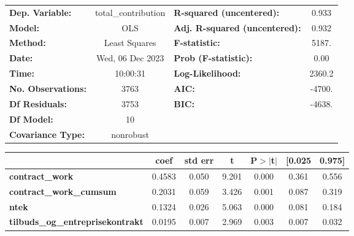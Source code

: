 \begin{center}
\begin{tabular}{lclc}
\toprule
\textbf{Dep. Variable:}                  & total\_contribution & \textbf{  R-squared (uncentered):}      &     0.933   \\
\textbf{Model:}                          &         OLS         & \textbf{  Adj. R-squared (uncentered):} &     0.932   \\
\textbf{Method:}                         &    Least Squares    & \textbf{  F-statistic:       }          &     5187.   \\
\textbf{Date:}                           &   Wed, 06 Dec 2023  & \textbf{  Prob (F-statistic):}          &     0.00    \\
\textbf{Time:}                           &       10:00:31      & \textbf{  Log-Likelihood:    }          &    2360.2   \\
\textbf{No. Observations:}               &          3763       & \textbf{  AIC:               }          &    -4700.   \\
\textbf{Df Residuals:}                   &          3753       & \textbf{  BIC:               }          &    -4638.   \\
\textbf{Df Model:}                       &            10       & \textbf{                     }          &             \\
\textbf{Covariance Type:}                &      nonrobust      & \textbf{                     }          &             \\
\bottomrule
\end{tabular}
\begin{tabular}{lcccccc}
                                         & \textbf{coef} & \textbf{std err} & \textbf{t} & \textbf{P$> |$t$|$} & \textbf{[0.025} & \textbf{0.975]}  \\
\midrule
\textbf{contract\_work}                  &       0.4583  &        0.050     &     9.201  &         0.000        &        0.361    &        0.556     \\
\textbf{contract\_work\_cumsum}          &       0.2031  &        0.059     &     3.426  &         0.001        &        0.087    &        0.319     \\
\textbf{ntek}                            &       0.1324  &        0.026     &     5.063  &         0.000        &        0.081    &        0.184     \\
\textbf{tilbuds\_og\_entreprisekontrakt} &       0.0195  &        0.007     &     2.969  &         0.003        &        0.007    &        0.032     \\

\end{tabular}
\end{center}
